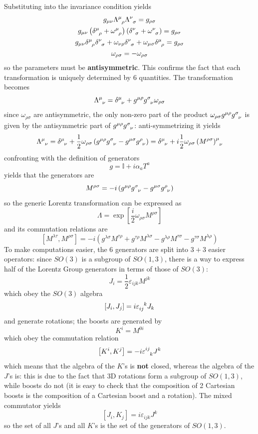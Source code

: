 Substituting into the invariance condition yields
\begin{gather*}
g_{\mu\nu} \Lambda\indices{^\mu_\rho}\Lambda\indices{^\nu_\sigma} = g_{\rho\sigma}\\
g_{\mu\nu} \left(\delta\indices{^\mu_\rho}+\omega\indices{^\mu_\rho}\right)
\left(\delta\indices{^\nu_\sigma}+\omega\indices{^\nu_\sigma}\right)=g_{\rho\sigma}\\
g_{\mu\nu}\delta\indices{^\mu_\rho}\delta\indices{^\nu_\sigma} + 
\omega_{\nu\rho}\delta\indices{^\nu_\sigma} +
\omega_{\mu\sigma}\delta\indices{^\mu_\rho}=g_{\rho\sigma}\\
\omega_{\rho\sigma} = -\omega_{\rho\sigma}
\end{gather*}
so the parameters must be \textbf{antisymmetric}. This confirms the fact that
each transformation is uniquely determined by 6 quantities.
The transformation becomes
$$\Lambda\indices{^\mu_\nu}  =\delta\indices{^\mu_\nu} +
g^{\mu\rho}g\indices{^\sigma_\nu}\omega_{\rho\sigma}$$
since $\omega_{\rho\sigma}$ are antisymmetric, the only non-zero part of the product
$\omega_{\rho\sigma}g^{\mu\rho}g\indices{^\sigma_\nu}$ is given by the antisymmetric
part of $g^{\mu\rho}g\indices{^\sigma_\nu}$: anti-symmetrizing it yields
$$\Lambda\indices{^\mu_\nu} = \delta\indices{^\mu_\nu}+\frac{1}{2}\omega_{\rho\sigma}
\left(g^{\mu\rho}g\indices{^\sigma_\nu}-g^{\mu\sigma}g\indices{^\rho_\nu}\right)=
\delta\indices{^\mu_\nu} + i\frac{1}{2}\omega_{\rho\sigma}\left(M^{\rho\sigma}\right)
\indices{^\mu_\nu}
$$
confronting with the definition of generators
$$g=\mathbb{I} + i\alpha_aT^a$$
yields that the generators are
$$M^{\rho\sigma} = -i\left(g^{\mu\rho}g\indices{^\sigma_\nu}-g^{\mu\sigma}
g\indices{^\rho_\nu}\right)$$
so the generic Lorentz transformation can be expressed as
$$\Lambda = \exp\left[\frac{i}{2}\omega_{\rho\sigma}M^{\rho\sigma}\right]$$
and its commutation relations are
$$\left[M^{\lambda\tau},M^{\rho\sigma}\right]= -i \left(
    g^{\lambda\sigma}M^{\tau\rho}+g^{\tau\rho}M^{\lambda\sigma}-g^{\lambda\rho}
    M^{\tau\sigma}-g^{\tau\sigma}M^{\lambda\rho}
\right)$$
To make computations easier, the 6 generators are split into $3+3$ easier operators:
since $SO(3)$ is a subgroup of $SO(1,3)$, there is a way to express half of the
Lorentz Group generators in terms of those of $SO(3)$:
$$J_i  =\frac{1}{2}\varepsilon_{ijk}M^{jk}$$
which obey the $SO(3)$ algebra
$$\left[J_i,J_j\right] = i \varepsilon\indices{_i_j^k}J_k$$
and generate rotations; the boosts are generated by
$$K^i = M^{0i}$$
which obey the commutation relation
$$\left[K^i,K^j\right] = -i \varepsilon\indices{^i^j_k}J^k$$
which means that the algebra of the $K$'s is \textbf{not} closed, whereas the algebra
of the $J$'s is: this is due to the fact that 3D rotations form a subgroup of
$SO(1,3)$, while boosts do not (it is easy to check that the composition of 2 Cartesian
boosts is the composition of a Cartesian boost and a rotation).
The mixed commutator yields
$$[J_i,K_j] = i\varepsilon_{ijk}J^k$$
so the set of all $J$'s and all $K$'s is the set of the generators of $SO(1,3)$.
